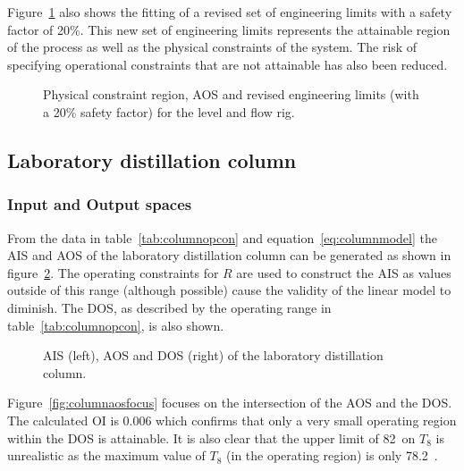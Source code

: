 Figure~\ref{fig:flowcontypes} also shows the fitting of a revised set of engineering limits with a safety factor of 20\%.
This new set of engineering limits represents the attainable region of the process as well as the physical constraints of the system.
The risk of specifying operational constraints that are not attainable has also been reduced.

\begin{figure}[htbp]
  \centering
    \scalebox{1}{}  
  \caption[Physical constraint region of level and flow rig]{Physical constraint region, AOS and revised engineering limits (with a 20\% safety factor) for the level and flow rig.}
  \label{fig:flowcontypes}
\end{figure}


\subsection{Laboratory distillation column}
\subsubsection{Input and Output spaces}
From the data in table~\ref{tab:columnopcon} and equation~\ref{eq:columnmodel} the AIS and AOS of the laboratory distillation column can be generated as shown in figure~\ref{fig:columnaisaos}.
The operating constraints for $R$ are used to construct the AIS as values outside of this range (although possible) cause the validity of the linear model to diminish.
The DOS, as described by the operating range in table~\ref{tab:columnopcon}, is also shown.

\begin{figure}[htbp]
  \centering
    \scalebox{1}{}  
    \scalebox{1}{}  
  \caption[AIS, AOS and DOS of the laboratory distillation column]{AIS (left), AOS and DOS (right) of the laboratory distillation column.}
  \label{fig:columnaisaos}
\end{figure}

Figure~\ref{fig:columnaosfocus} focuses on the intersection of the AOS and the DOS.
The calculated OI is 0.006 which confirms that only a very small operating region within the DOS is attainable.
It is also clear that the upper limit of 82~\textcelsius on $T_8$ is unrealistic as the maximum value of $T_8$ (in the operating region) is only 78.2~\textcelsius.


